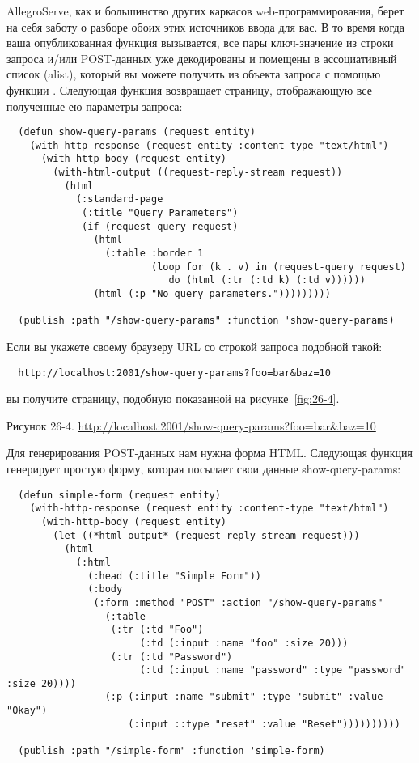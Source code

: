 AllegroServe, как и большинство других каркасов web-программирования, берет на себя заботу
о разборе обоих этих источников ввода для вас. В то время когда ваша опубликованная
функция вызывается, все пары ключ-значение из строки запроса и/или POST-данных уже
декодированы и помещены в ассоциативный список (alist), который вы можете получить из
объекта запроса с помощью функции . Следующая функция возвращает
страницу, отображающую все полученные ею параметры запроса:

\begin{lstlisting}
  (defun show-query-params (request entity)
    (with-http-response (request entity :content-type "text/html")
      (with-http-body (request entity)
        (with-html-output ((request-reply-stream request))
          (html
            (:standard-page
             (:title "Query Parameters")
             (if (request-query request)
               (html 
                 (:table :border 1
                         (loop for (k . v) in (request-query request)
                            do (html (:tr (:td k) (:td v))))))
               (html (:p "No query parameters.")))))))))

  (publish :path "/show-query-params" :function 'show-query-params)
\end{lstlisting}

Если вы укажете своему браузеру URL со строкой запроса подобной такой:

\begin{verbatim}
  http://localhost:2001/show-query-params?foo=bar&baz=10
\end{verbatim}

вы получите страницу, подобную показанной на рисунке~\ref{fig:26-4}.

Рисунок 26-4. \url{http://localhost:2001/show-query-params?foo=bar&baz=10}

Для генерирования POST-данных нам нужна форма HTML. Следующая функция генерирует простую
форму, которая посылает свои данные show-query-params:

\begin{lstlisting}
  (defun simple-form (request entity)
    (with-http-response (request entity :content-type "text/html")
      (with-http-body (request entity)
        (let ((*html-output* (request-reply-stream request)))
          (html
            (:html
              (:head (:title "Simple Form"))
              (:body
               (:form :method "POST" :action "/show-query-params"
                 (:table
                  (:tr (:td "Foo")
                       (:td (:input :name "foo" :size 20)))
                  (:tr (:td "Password")
                       (:td (:input :name "password" :type "password" :size 20))))
                 (:p (:input :name "submit" :type "submit" :value "Okay")
                     (:input ::type "reset" :value "Reset"))))))))))

  (publish :path "/simple-form" :function 'simple-form)
\end{lstlisting}

